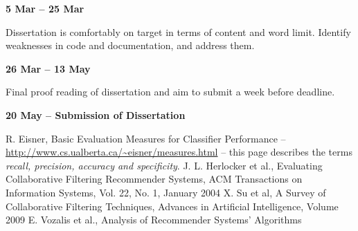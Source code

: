 \textbf{5 Mar -- 25 Mar}

Dissertation is comfortably on target in terms of content and word limit.
Identify weaknesses in code and documentation, and address them.

\textbf{26 Mar -- 13 May}

Final proof reading of dissertation and aim to submit a week before deadline.

\textbf{20 May -- Submission of Dissertation}

\begin{thebibliography}{}
  R. Eisner, Basic Evaluation Measures for Classifier Performance -- \url{http://www.cs.ualberta.ca/~eisner/measures.html} -- this page describes the terms \textit{recall, precision, accuracy and specificity}.
  J. L. Herlocker et al., Evaluating Collaborative Filtering Recommender Systems, ACM Transactions on Information Systems, Vol. 22, No. 1, January 2004
  X. Su et al, A Survey of Collaborative Filtering Techniques, Advances in Artificial Intelligence, Volume 2009
  E. Vozalis et al., Analysis of Recommender Systems’ Algorithms


\end{thebibliography}
